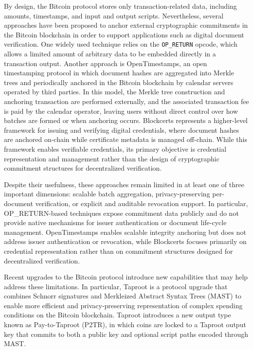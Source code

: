 \documentclass{IEEEoj}
\begin{document}
By design, the Bitcoin protocol stores only transaction-related data, including amounts, timestamps, and input and output scripts. 
Nevertheless, several approaches have been proposed to anchor external cryptographic commitments in the Bitcoin blockchain in order to support applications such as digital document verification. 
One widely used technique relies on the \texttt{OP\_RETURN} opcode, which allows a limited amount of arbitrary data to be embedded directly in a transaction output. 
Another approach is OpenTimestamps, an open timestamping protocol in which document hashes are aggregated into Merkle trees and periodically anchored in the Bitcoin blockchain by calendar servers operated by third parties. 
In this model, the Merkle tree construction and anchoring transaction are performed externally, and the associated transaction fee is paid by the calendar operator, leaving users without direct control over how batches are formed or when anchoring occurs. 
Blockcerts represents a higher-level framework for issuing and verifying digital credentials, where document hashes are anchored on-chain while certificate metadata is managed off-chain. While this framework enables verifiable credentials, its primary objective is credential representation and management rather than the design of cryptographic commitment structures for decentralized verification.

Despite their usefulness, these approaches remain limited in at least one of three important dimensions: scalable batch aggregation, privacy-preserving per-document verification, or explicit and auditable revocation support. 
In particular, OP\_RETURN-based techniques expose commitment data publicly and do not provide native mechanisms for issuer authentication or document life-cycle management. 
OpenTimestamps enables scalable integrity anchoring but does not address issuer authentication or revocation, while Blockcerts focuses primarily on credential representation rather than on commitment structures designed for decentralized verification.

Recent upgrades to the Bitcoin protocol introduce new capabilities that may help address these limitations. 
In particular, Taproot is a protocol upgrade that combines Schnorr signatures and Merkleized Abstract Syntax Trees (MAST) to enable more efficient and privacy-preserving representation of complex spending conditions on the Bitcoin blockchain.
Taproot introduces a new output type known as Pay-to-Taproot (P2TR), in which coins are locked to a Taproot output key that commits to both a public key and optional script paths encoded through MAST.
\end{document}
